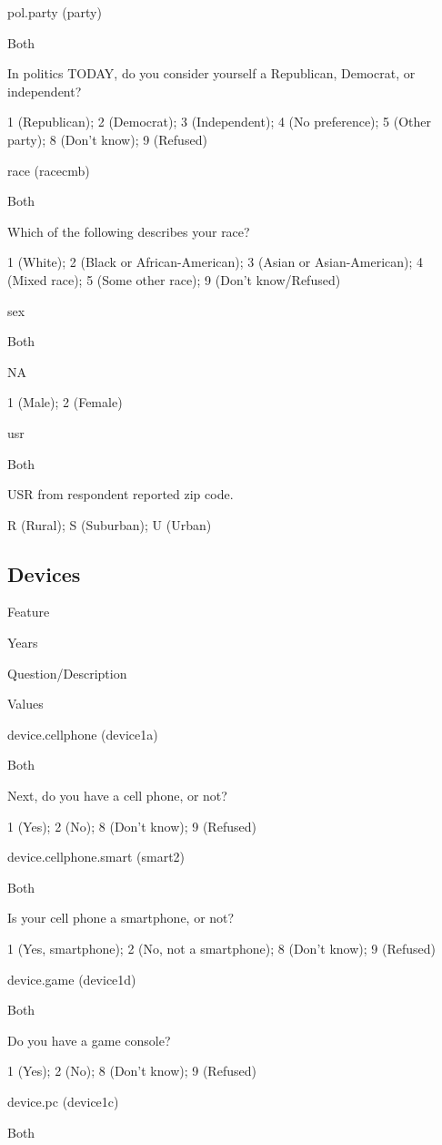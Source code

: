 \documentclass[]{book}
\begin{document}
pol.party (party)

Both

In politics TODAY, do you consider yourself a Republican, Democrat, or
independent?

1 (Republican); 2 (Democrat); 3 (Independent); 4 (No preference); 5
(Other party); 8 (Don't know); 9 (Refused)

race (racecmb)

Both

Which of the following describes your race?

1 (White); 2 (Black or African-American); 3 (Asian or Asian-American); 4
(Mixed race); 5 (Some other race); 9 (Don't know/Refused)

sex

Both

NA

1 (Male); 2 (Female)

usr

Both

USR from respondent reported zip code.

R (Rural); S (Suburban); U (Urban)

\subsection*{Devices}\label{devices}

Feature

Years

Question/Description

Values

device.cellphone (device1a)

Both

Next, do you have a cell phone, or not?

1 (Yes); 2 (No); 8 (Don't know); 9 (Refused)

device.cellphone.smart (smart2)

Both

Is your cell phone a smartphone, or not?

1 (Yes, smartphone); 2 (No, not a smartphone); 8 (Don't know); 9
(Refused)

device.game (device1d)

Both

Do you have a game console?

1 (Yes); 2 (No); 8 (Don't know); 9 (Refused)

device.pc (device1c)

Both
\end{document}
